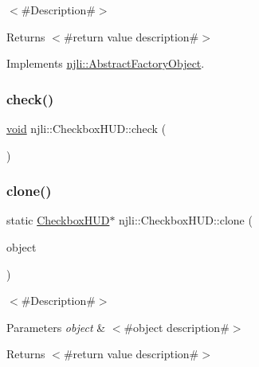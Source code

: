 $<$\#\+Description\#$>$

\begin{DoxyReturn}{Returns}
$<$\#return value description\#$>$ 
\end{DoxyReturn}


Implements \mbox{\hyperlink{classnjli_1_1_abstract_factory_object_a4763d05bc9dc37c559111f8bb30e1dd8}{njli\+::\+Abstract\+Factory\+Object}}.

\mbox{\label{classnjli_1_1_checkbox_h_u_d_ad543bafb52bd55a7143af7a9312d663a}} 
\subsubsection{\texorpdfstring{check()}{check()}}
{\footnotesize\ttfamily \mbox{\hyperlink{_thread_8h_af1e856da2e658414cb2456cb6f7ebc66}{void}} njli\+::\+Checkbox\+H\+U\+D\+::check (\begin{DoxyParamCaption}{ }\end{DoxyParamCaption})}

\mbox{\label{classnjli_1_1_checkbox_h_u_d_aa7dd57a54aa295cabb00bfa5440024b8}} 
\subsubsection{\texorpdfstring{clone()}{clone()}}
{\footnotesize\ttfamily static \mbox{\hyperlink{classnjli_1_1_checkbox_h_u_d}{Checkbox\+H\+UD}}$\ast$ njli\+::\+Checkbox\+H\+U\+D\+::clone (\begin{DoxyParamCaption}\item[{const \mbox{\hyperlink{classnjli_1_1_checkbox_h_u_d}{Checkbox\+H\+UD}} \&}]{object }\end{DoxyParamCaption})\hspace{0.3cm}{\ttfamily [static]}}

$<$\#\+Description\#$>$


\begin{DoxyParams}{Parameters}
{\em object} & $<$\#object description\#$>$\\
\hline
\end{DoxyParams}
\begin{DoxyReturn}{Returns}
$<$\#return value description\#$>$ 
\end{DoxyReturn}
\mbox{\label{classnjli_1_1_checkbox_h_u_d_a4e36b531b587aa5b8b6c0f4784cf6da5}} 
